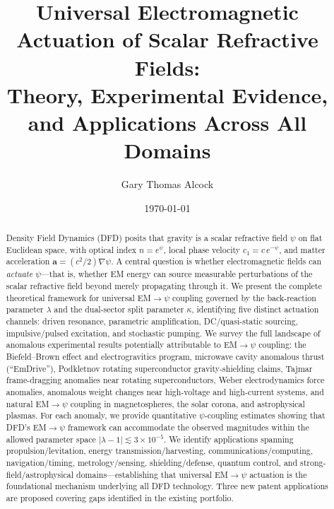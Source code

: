 \documentclass[aps,prd,twocolumn,superscriptaddress,floatfix,nofootinbib]{revtex4-2}
\newcommand{\avec}{\mathbf{a}}
\begin{document}
\title{Universal Electromagnetic Actuation of Scalar Refractive Fields:\\
Theory, Experimental Evidence, and Applications Across All Domains}

\author{Gary Thomas Alcock}

\date{\today}

\begin{abstract}
Density Field Dynamics (DFD) posits that gravity is a scalar refractive field
$\psi$ on flat Euclidean space, with optical index $n = e^\psi$, local phase
velocity $c_1 = c\,e^{-\psi}$, and matter acceleration
$\avec = (c^2/2)\nabla\psi$. A central question is whether electromagnetic
fields can \emph{actuate} $\psi$---that is, whether EM energy can source
measurable perturbations of the scalar refractive field beyond merely
propagating through it. We present the complete theoretical framework for
universal EM$\to\psi$ coupling governed by the back-reaction parameter
$\lambda$ and the dual-sector split parameter $\kappa$, identifying five
distinct actuation channels: driven resonance, parametric amplification,
DC/quasi-static sourcing, impulsive/pulsed excitation, and stochastic
pumping. We survey the full landscape of anomalous experimental results
potentially attributable to EM$\to\psi$ coupling: the Biefeld--Brown
effect and electrogravitics program, microwave cavity anomalous thrust
(``EmDrive''), Podkletnov rotating superconductor gravity-shielding claims,
Tajmar frame-dragging anomalies near rotating superconductors, Weber
electrodynamics force anomalies, anomalous weight changes near high-voltage
and high-current systems, and natural EM$\to\psi$ coupling in
magnetospheres, the solar corona, and astrophysical plasmas. For each
anomaly, we provide quantitative $\psi$-coupling estimates showing that
DFD's EM$\to\psi$ framework can accommodate the observed magnitudes within
the allowed parameter space $|\lambda - 1| \lesssim 3 \times 10^{-5}$.
We identify applications spanning propulsion/levitation, energy
transmission/harvesting, communications/computing, navigation/timing,
metrology/sensing, shielding/defense, quantum control, and
strong-field/astrophysical domains---establishing that universal EM$\to\psi$
actuation is the foundational mechanism underlying all DFD technology.
Three new patent applications are proposed covering gaps identified in the
existing portfolio.
\end{abstract}

\maketitle
\tableofcontents
\end{document}
